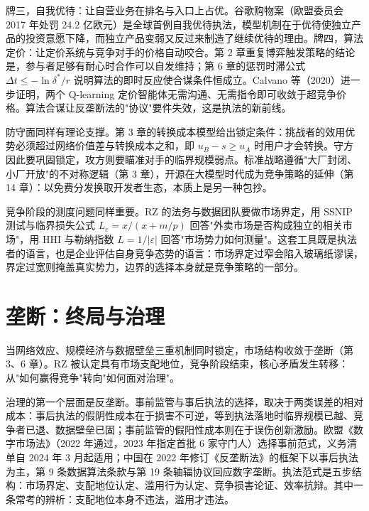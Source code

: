 牌三，自我优待：让自营业务在排名与入口上占优。谷歌购物案（欧盟委员会 2017 年处罚 24.2 亿欧元）是全球首例自我优待执法，模型机制在于优待使独立产品的投资意愿下降，而独立产品变弱又反过来制造了继续优待的理由。牌四，算法定价：让定价系统与竞争对手的价格自动咬合。第 2 章重复博弈触发策略的结论是，参与者足够有耐心时合作可以自发维持；第 6 章的惩罚时滞公式 $\Delta t\leq-\ln\delta^{*}/r$ 说明算法的即时反应使合谋条件恒成立。Calvano 等（2020）进一步证明，两个 Q-learning 定价智能体无需沟通、无需指令即可收敛于超竞争价格。算法合谋让反垄断法的"协议"要件失效，这是执法的新前线。

防守面同样有理论支撑。第 3 章的转换成本模型给出锁定条件：挑战者的效用优势必须超过网络价值差与转换成本之和，即 $u_B-s\geq u_A$ 时用户才会转换。守方因此要巩固锁定，攻方则要瞄准对手的临界规模弱点。标准战略遵循"大厂封闭、小厂开放"的不对称逻辑（第 3 章），开源在大模型时代成为竞争策略的延伸（第 14 章）：以免费分发换取开发者生态，本质上是另一种包抄。

竞争阶段的测度问题同样重要。RZ 的法务与数据团队要做市场界定，用 SSNIP 测试与临界损失公式 $L_c=x/(x+m/p)$ 回答"外卖市场是否构成独立的相关市场"，用 HHI 与勒纳指数 $L=1/|\varepsilon|$ 回答"市场势力如何测量"。这套工具既是执法者的语言，也是企业评估自身竞争态势的语言：市场界定过窄会陷入玻璃纸谬误，界定过宽则掩盖真实势力，边界的选择本身就是竞争策略的一部分。

\section{垄断：终局与治理}

当网络效应、规模经济与数据壁垒三重机制同时锁定，市场结构收敛于垄断（第 3、6 章）。RZ 被认定具有市场支配地位，竞争阶段结束，核心矛盾发生转移：从"如何赢得竞争"转向"如何面对治理"。

治理的第一个层面是反垄断。事前监管与事后执法的选择，取决于两类误差的相对成本：事后执法的假阴性成本在于损害不可逆，等到执法落地时临界规模已越、竞争者已退、数据壁垒已固；事前监管的假阳性成本则在于误伤创新激励。欧盟《数字市场法》（2022 年通过，2023 年指定首批 6 家守门人）选择事前范式，义务清单自 2024 年 3 月起适用；中国在 2022 年修订《反垄断法》的框架下以事后执法为主，第 9 条数据算法条款与第 19 条轴辐协议回应数字垄断。执法范式是五步结构：市场界定、支配地位认定、滥用行为认定、竞争损害论证、效率抗辩。其中一条常考的辨析：支配地位本身不违法，滥用才违法。

